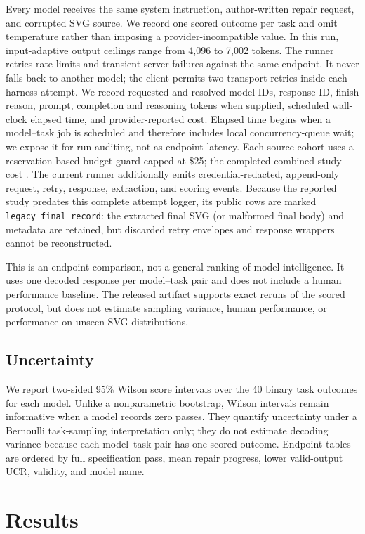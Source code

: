 \documentclass[11pt]{article}
\begin{document}
Every model receives the same system instruction, author-written repair request, and
corrupted SVG source. We record one scored outcome per task and omit temperature
rather than imposing a provider-incompatible value. In this run, input-adaptive
output ceilings range from 4,096 to 7,002 tokens. The runner retries rate
limits and transient server failures against the same endpoint. It never falls
back to another model; the client permits two transport retries inside each
harness attempt. We record requested and resolved model IDs, response ID,
finish reason, prompt, completion and reasoning tokens when supplied, scheduled
wall-clock elapsed time, and provider-reported cost. Elapsed time begins when a
model--task job is scheduled and therefore includes local concurrency-queue wait;
we expose it for run auditing, not as endpoint latency. Each source cohort uses
a reservation-based budget guard capped at \$25; the completed combined study
cost \TotalCost{}. The current runner additionally emits credential-redacted,
append-only request, retry, response, extraction, and scoring events. Because the
reported study predates this complete attempt logger, its public rows are marked
\texttt{legacy\_final\_record}: the extracted final SVG (or malformed final body)
and metadata are retained, but discarded retry envelopes and response wrappers
cannot be reconstructed.

This is an endpoint comparison, not a general ranking of model intelligence.
It uses one decoded response per model--task pair and does not include a human
performance baseline. The released artifact supports exact reruns of the
scored protocol, but does not estimate sampling variance, human performance, or
performance on unseen SVG distributions.

\subsection{Uncertainty}

We report two-sided 95\% Wilson score intervals over the 40 binary task outcomes
for each model. Unlike a nonparametric bootstrap, Wilson intervals remain
informative when a model records zero passes. They quantify uncertainty under a
Bernoulli task-sampling interpretation only; they do not estimate decoding
variance because each model--task pair has one scored outcome. Endpoint tables
are ordered by full specification pass, mean repair progress, lower valid-output
UCR, validity, and model name.

\section{Results}
\label{sec:results}
\end{document}
